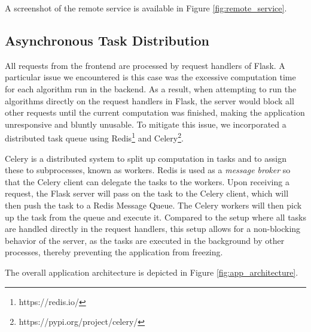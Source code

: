 A screenshot of the remote service is available in Figure \ref{fig:remote_service}.

\subsection{Asynchronous Task Distribution}
All requests from the frontend are processed by request handlers of Flask. A particular issue we encountered is this case was the excessive computation time for each algorithm run in the backend. As a result, when attempting to run the algorithms directly on the request handlers in Flask, the server would block all other requests until the current computation was finished, making the application unresponsive and bluntly unusable. To mitigate this issue, we incorporated a distributed task queue using Redis\footnote{https://redis.io/} and Celery\footnote{https://pypi.org/project/celery/}.

Celery is a distributed system to split up computation in tasks and to assign these to subprocesses, known as workers. Redis is used as a \emph{message broker} so that the Celery client can delegate the tasks to the workers. Upon receiving a request, the Flask server will pass on the task to the Celery client, which will then push the task to a Redis Message Queue. The Celery workers will then pick up the task from the queue and execute it. Compared to the setup where all tasks are handled directly in the request handlers, this setup allows for a non-blocking behavior of the server, as the tasks are executed in the background by other processes, thereby preventing the application from freezing.

The overall application architecture is depicted in Figure \ref{fig:app_architecture}.

